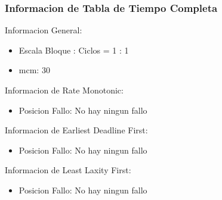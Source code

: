 \documentclass[xcolor=table]{beamer}
\begin{document}
\begin{frame} 
\frametitle{Informacion de Tabla de Tiempo Completa} 
Informacion General:\\ 
\begin{itemize} 
\item Escala Bloque : Ciclos = 1 : 1 \\ 
\item mcm:  30 \\ 
\end{itemize} 
Informacion de Rate Monotonic:\\ 
\begin{itemize} 
\item Posicion Fallo: No hay ningun fallo \\ 
\end{itemize} 
Informacion de Earliest Deadline First:\\ 
\begin{itemize} 
\item Posicion Fallo: No hay ningun fallo \\ 
\end{itemize} 
Informacion de Least Laxity First:\\ 
\begin{itemize} 
\item Posicion Fallo: No hay ningun fallo \\ 
\end{itemize} 
\end{frame} 

\end{document}
